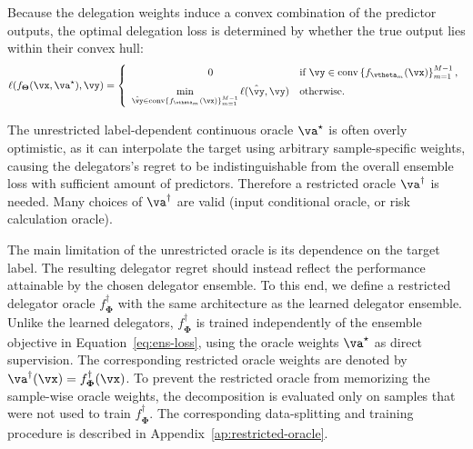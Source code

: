 \documentclass[10pt]{article} %
\def\vTheta{{\bm{\Theta}}}
\def\vPhi{{\bm{\Phi}}}
\begin{document}
Because the delegation weights induce a convex combination of the predictor outputs, the optimal delegation loss is determined by whether the true output lies within their convex hull:
\begin{equation}
\ell\!\left(f_{\vTheta}(\vx,\va^\star),\vy\right)
=
\left\{
\begin{array}{c@{\quad}l}
0
&
\displaystyle
\text{if }
\vy\in\operatorname{conv}
\left\{f_{\vtheta_m}(\vx)\right\}_{m=1}^{M-1},
\\[2mm]
\displaystyle
\min_{\hat{\vy}\in\operatorname{conv}
\left\{f_{\vtheta_m}(\vx)\right\}_{m=1}^{M-1}}
\ell(\hat{\vy},\vy)
&
\text{otherwise}.
\end{array}
\right.
\end{equation}

The unrestricted label-dependent continuous oracle $\va^{\star}$ is often overly optimistic, as it can interpolate the target using arbitrary sample-specific weights, causing the delegators's regret to be indistinguishable from the overall ensemble loss with sufficient amount of predictors. Therefore a restricted oracle $\va^{\dagger}$ is needed. Many choices of $\va^{\dagger}$ are valid (input conditional oracle, or risk calculation oracle). 

The main limitation of the unrestricted oracle is its dependence on the target label. The resulting delegator regret should instead reflect the performance attainable by the chosen delegator ensemble. To this end, we define a restricted delegator oracle \(f_{\vPhi}^{\dagger}\) with the same architecture as the learned delegator ensemble. Unlike the learned delegators, \(f_{\vPhi}^{\dagger}\) is trained independently of the ensemble objective in Equation~\ref{eq:ens-loss}, using the oracle weights \(\va^\star\) as direct supervision. The corresponding restricted oracle weights are denoted by $\va^\dagger(\vx) = f_{\vPhi}^{\dagger}(\vx)$. To prevent the restricted oracle from memorizing the sample-wise oracle weights, the decomposition is evaluated only on samples that were not used to train \(f_{\vPhi}^{\dagger}\). The corresponding data-splitting and training procedure is described in Appendix~\ref{ap:restricted-oracle}.
\end{document}
